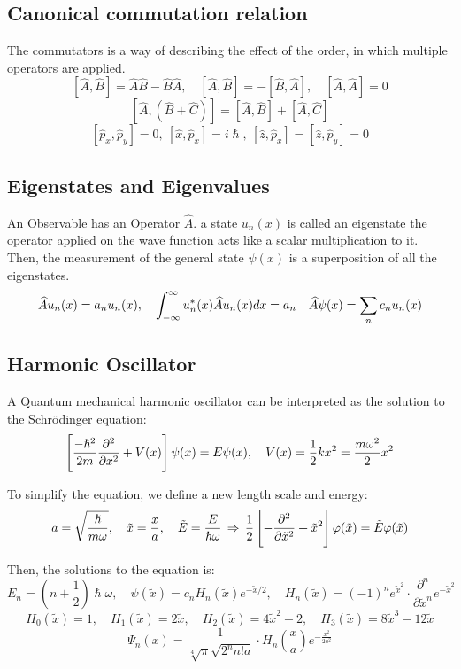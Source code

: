 \documentclass{article}
\begin{document}
\subsection{Canonical commutation relation}

The commutators is a way of describing the effect of the order, in which multiple operators are applied.
$$\left[\hat{A},\hat{B}\right] = \hat{A} \hat{B} - \hat{B} \hat{A}, \quad \left[\hat A,\hat B\right] = -\left[\hat B,\hat A\right], \quad \left[\hat A,\hat A\right] = 0$$
$$\left[\hat A,(\hat B+\hat C)\right] = \left[\hat A,\hat B\right] + \left[\hat A,\hat C\right]$$
$$\left[\hat p_x,\hat p_y\right] = 0, \ \left[\hat x,\hat p_x\right] = i\hslash, \ \left[\hat z,\hat p_x\right] = \left[\hat z,\hat p_y\right] = 0$$

\subsection{Eigenstates and Eigenvalues}

An Observable has an Operator $\hat{A}$. a state $u_n(x)$ is called an eigenstate the operator applied on the wave function acts like a scalar multiplication to it. Then, the measurement of the general state $\psi(x)$ is a superposition of all the eigenstates.
$$\widehat{A} u_n(x) = a_n u_n(x), \quad \int_{-\infty}^{\infty} u^\ast_n(x) \widehat{A} u_n(x) dx = a_n \quad \widehat{A} \psi(x) = \sum_n c_n u_n(x)$$


\subsection{Harmonic Oscillator}

A Quantum mechanical harmonic oscillator can be interpreted as the solution to the Schrödinger equation:
$$\left[ \frac{-\hslash^2}{2m} \frac{\partial^2 }{\partial x ^2}  + V(x) \right] \psi(x) = E \psi(x), \quad V(x) = \frac{1}{2} k x^2 = \frac{m \omega^2}{2} x^2$$

To simplify the equation, we define a new length scale and energy:
$$a = \sqrt{\frac{\hslash}{m \omega}}, \quad \tilde{x} = \frac{x}{a}, \quad \tilde{E} = \frac{E}{\hslash \omega} \, \Rightarrow \, \frac{1}{2} \left[-\frac{\partial^2 }{\partial \tilde{x} ^2} + \tilde{x}^2\right] \varphi(\tilde{x}) = \tilde{E} \varphi(\tilde{x})$$

Then, the solutions to the equation is:
$$E_n = \left(n + \frac{1}{2}\right) \hslash \omega, \quad \psi(\tilde{x}) = c_n H_n(\tilde{x}) e^{-
\tilde{x}/2}, \quad H_n(\tilde{x}) = (-1)^n e^{\tilde{x}^2} \cdot \frac{\partial^n}{\partial \tilde{x}^n} e^{-\tilde{x}^2}$$
$$H_0(\tilde{x}) = 1, \quad H_1(\tilde{x}) = 2 \tilde{x}, \quad H_2(\tilde{x}) = 4 \tilde{x}^2 - 2, \quad H_3(\tilde{x}) =8 \tilde{x}^3 - 12\tilde{x}$$
$$\Psi_n(x) = \frac{1}{\sqrt[4]{\pi} \sqrt{2^n n! a}} \cdot H_n\left(\frac{x}{a}\right) e^{-\frac{x^2}{2a^2}}$$
\end{document}
